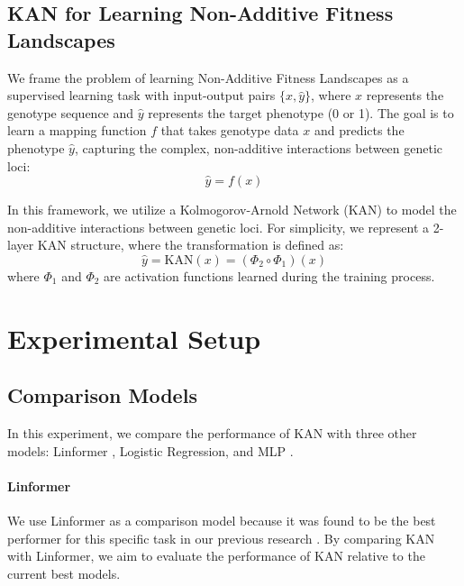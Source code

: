\documentclass{article}
\begin{document}
\subsection{KAN for Learning Non-Additive Fitness Landscapes}

We frame the problem of learning Non-Additive Fitness Landscapes as a supervised learning task with input-output pairs \( \{ x, \hat{y} \} \), where \( x \) represents the genotype sequence and \( \hat{y} \) represents the target phenotype (0 or 1). The goal is to learn a mapping function \( f \) that takes genotype data \( x \) and predicts the phenotype \( \hat{y} \), capturing the complex, non-additive interactions between genetic loci:
\begin{equation}
\hat{y} = f(x)
\end{equation}

In this framework, we utilize a Kolmogorov-Arnold Network (KAN) to model the non-additive interactions between genetic loci. For simplicity, we represent a 2-layer KAN structure, where the transformation is defined as:
\begin{equation}
\hat{y} = \text{KAN}(x) = (\Phi_2 \circ \Phi_1)(x)
\end{equation}
where \( \Phi_1 \) and \( \Phi_2 \) are activation functions learned during the training process.



\section{Experimental Setup}

\subsection{Comparison Models}
In this experiment, we compare the performance of KAN with three other models: Linformer \parencite{wang2020linformer}, Logistic Regression, and MLP \parencite{hornik1989multilayer}.


\paragraph{Linformer}

We use Linformer as a comparison model because it was found to be the best performer for this specific task in our previous research \parencite{kieransimulatepaper} \parencite{collienne2023machine} \parencite{Elmes2022.07.07.499217}. By comparing KAN with Linformer, we aim to evaluate the performance of KAN relative to the current best models.
\end{document}
